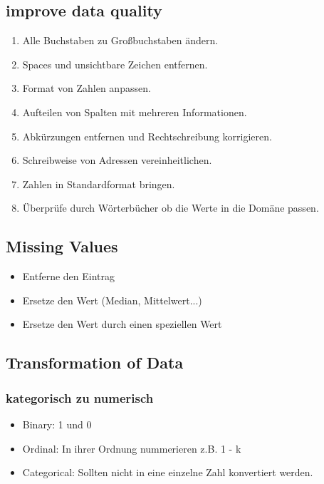 \documentclass[a4paper]{scrartcl}
\begin{document}
\subsection{improve data quality}
\begin{enumerate}
\setlength{\parskip}{0pt}
\item Alle Buchstaben zu Großbuchstaben ändern.
\item Spaces und unsichtbare Zeichen entfernen.
\item Format von Zahlen anpassen.
\item Aufteilen von Spalten mit mehreren Informationen.
\item Abkürzungen entfernen und Rechtschreibung korrigieren.
\item Schreibweise von Adressen vereinheitlichen.
\item Zahlen in Standardformat bringen.
\item Überprüfe durch Wörterbücher ob die Werte in die Domäne passen.
\end{enumerate}

\subsection{Missing Values}
\begin{itemize}
\item Entferne den Eintrag
\item Ersetze den Wert (Median, Mittelwert...)
\item Ersetze den Wert durch einen speziellen Wert
\end{itemize}

\subsection{Transformation of Data}
\subsubsection{kategorisch zu numerisch}
\begin{itemize}
\item Binary: 1 und 0
\item Ordinal: In ihrer Ordnung nummerieren z.B. 1 - k
\item Categorical: Sollten nicht in eine einzelne Zahl konvertiert werden.
\end{itemize}
\end{document}
